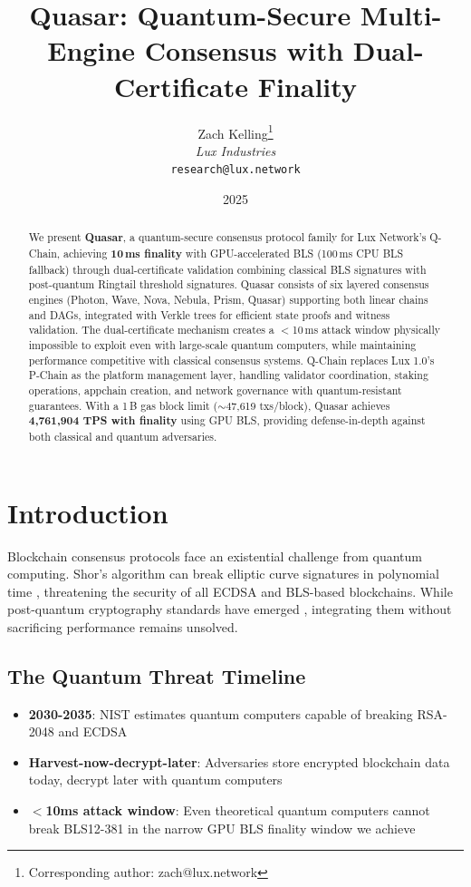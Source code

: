 \documentclass[11pt]{article}
\title{Quasar: Quantum-Secure Multi-Engine Consensus with Dual-Certificate Finality}
\author{
Zach Kelling\thanks{Corresponding author: zach@lux.network}\\
\textit{Lux Industries}\\
\texttt{research@lux.network}
}
\date{2025}
\begin{document}
\luxcoverpage

\begin{abstract}
We present \textbf{Quasar}, a quantum-secure consensus protocol family for Lux Network's Q-Chain, achieving \textbf{10\,ms finality} with GPU-accelerated BLS (100\,ms CPU BLS fallback) through dual-certificate validation combining classical BLS signatures with post-quantum Ringtail threshold signatures. Quasar consists of six layered consensus engines (Photon, Wave, Nova, Nebula, Prism, Quasar) supporting both linear chains and DAGs, integrated with Verkle trees for efficient state proofs and witness validation. The dual-certificate mechanism creates a $<$10\,ms attack window physically impossible to exploit even with large-scale quantum computers, while maintaining performance competitive with classical consensus systems. Q-Chain replaces Lux 1.0's P-Chain as the platform management layer, handling validator coordination, staking operations, appchain creation, and network governance with quantum-resistant guarantees. With a 1\,B gas block limit ($\sim$47{,}619 txs/block), Quasar achieves \textbf{4{,}761{,}904 TPS with finality} using GPU BLS, providing defense-in-depth against both classical and quantum adversaries.
\end{abstract}

\section{Introduction}

Blockchain consensus protocols face an existential challenge from quantum computing. Shor's algorithm can break elliptic curve signatures in polynomial time \cite{shor1994}, threatening the security of all ECDSA and BLS-based blockchains. While post-quantum cryptography standards have emerged \cite{nist-pqc}, integrating them without sacrificing performance remains unsolved.

\subsection{The Quantum Threat Timeline}

\begin{itemize}
\item \textbf{2030-2035}: NIST estimates quantum computers capable of breaking RSA-2048 and ECDSA \cite{mosca2018}
\item \textbf{Harvest-now-decrypt-later}: Adversaries store encrypted blockchain data today, decrypt later with quantum computers
\item \textbf{$<$10ms attack window}: Even theoretical quantum computers cannot break BLS12-381 in the narrow GPU BLS finality window we achieve
\end{itemize}
\end{document}
